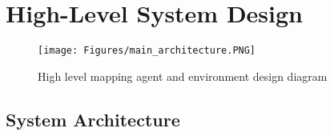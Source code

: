 






\chapter{High-Level System Design} 
\label{chapter:System_Design}



\begin{figure}[H]
    \centering
    \texttt{[image: Figures/main\_architecture.PNG]}
    \caption{High level mapping agent and environment design diagram} 
    \label{fig:agent_and_environment_design}
\end{figure}



\section{System Architecture}

